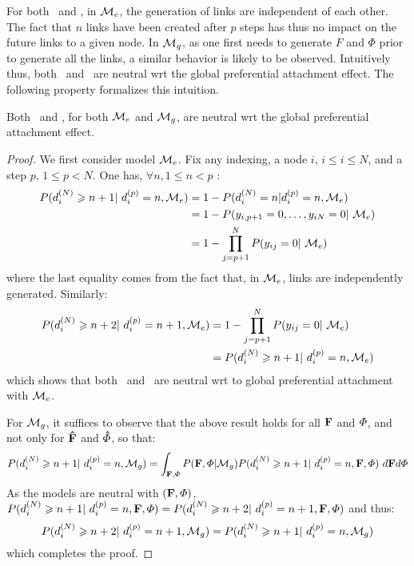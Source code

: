 For both \ifm\ and \imb, in $\mathcal{M}_e$, the generation of links are independent of each other. The fact that $n$ links have been created after $p$ steps has thus no impact on the future links to a given node. In $\mathcal{M}_g$, as one first needs to generate $F$ and $\Phi$ prior to generate all the links, a similar behavior is likely to be observed. Intuitively thus, both \ifm\ and \imb\ are neutral wrt the global preferential attachment effect. The following property formalizes this intuition.
%
\begin{proposition} \label{th:mg_glob}
Both \ifm\ and \imb, for both $\mathcal{M}_e$ and $\mathcal{M}_g$, are neutral wrt the global preferential attachment effect.
\end{proposition}
%
\begin{proof}
We first consider model $\mathcal{M}_e$. Fix any indexing, a node $i$, $i \leq i \leq N$, and a step $p$, $1 \leq p < N$. One has, $\forall n, 1 \leq n < p$ :
%
\begin{align*}
P(d_i^{(N)} \geq n+1 | d_i^{(p)}=n, \M_e) &= 1 - P(d_i^{(N)}=n | d_i^{(p)}=n, \M_e) \\
        &= 1 -P(y_{i,p+1}=0, \dotsc,y_{iN}=0 | \M_e ) \\
        &= 1 - \prod_{j=p+1}^N P(y_{ij}=0 | \M_e)
\end{align*}
%
where the last equality comes from the fact that, in $\mathcal{M}_e$, links are independently generated. Similarly:
%
\begin{align*}
P(d_i^{(N)} \geq n+2 | d_i^{(p)}=n+1, \M_e) &= 1 - \prod_{j=p+1}^N P(y_{ij}=0 | \M_e) \\
                    &=P(d_i^{(N)} \geq n+1 | d_i^{(p)}=n, \M_e)
\end{align*}
%
which shows that both \ifm\ and \imb\ are neutral wrt to global preferential attachment with $\mathcal{M}_e$.

For $\mathcal{M}_g$, it suffices to observe that the above result holds for all $\mathbf{F}$ and $\mat{\Phi}$, and not only for $\mathbf{\hat{F}}$ and $\mat{\hat{\Phi}}$, so that:
%
\begin{equation*}
P(d_i^{(N)} \geq n+1 | d_i^{(p)}=n, \M_g)  = \int_{\mat{F},\mat{\Phi}} P(\mat{F},\mat{\Phi}|\M_g) P(d_i^{(N)} \geq n+1 | d_i^{(p)}=n, \mat{F},\mat{\Phi}) \ d\mat{F} d\mat{\Phi}
\end{equation*}
%
As the models are neutral with $(\mat{F},\mat{\Phi})$, $P(d_i^{(N)} \geq n+1 | d_i^{(p)}=n, \mat{F},\mat{\Phi}) = P(d_i^{(N)} \geq n+2 | d_i^{(p)}=n+1, \mat{F},\mat{\Phi})$ and thus:
%
\begin{equation*}
P(d_i^{(N)} \geq n+2 | d_i^{(p)}=n+1, \M_g) = P(d_i^{(N)} \geq n+1 | d_i^{(p)}=n, \M_g)
\end{equation*}
%
which completes the proof.
\end{proof}

